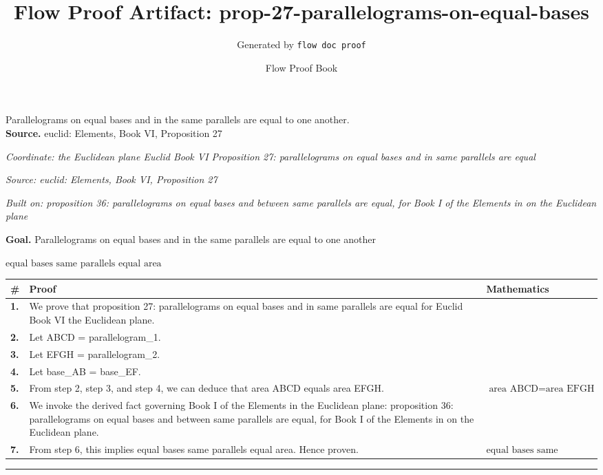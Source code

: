 \documentclass[11pt]{article}
\title{Flow Proof Artifact: prop-27-parallelograms-on-equal-bases}
\author{Generated by \texttt{flow doc proof}}
\date{Flow Proof Book}
\theoremstyle{definition}
\begin{document}
\maketitle
Parallelograms on equal bases and in the same parallels are equal to one another.\\[0.5em]
\textbf{Source.} euclid: Elements, Book VI, Proposition 27\\[0.5em]
\bigskip
{}\par
\smallskip\noindent\textit{Coordinate: the Euclidean plane \cdot Euclid Book VI \cdot Proposition 27: parallelograms on equal bases and in same parallels are equal}\par
\smallskip\noindent\textit{Source: euclid: Elements, Book VI, Proposition 27}\par
\smallskip\noindent\textit{Built on: proposition 36: parallelograms on equal bases and between same parallels are equal, for Book I of the Elements in on the Euclidean plane}\par
\medskip
\noindent\textbf{Goal.} Parallelograms on equal bases and in the same parallels are equal to one another\par
\noindent$\displaystyle \text{equal bases same parallels equal area}$\par
\medskip
\noindent
\begin{tabular}{@{} >{\raggedright\arraybackslash}p{} >{\raggedright\arraybackslash}p{} >{\raggedleft\arraybackslash}p{} @{}}
\textbf{\#} & \textbf{Proof} & \textbf{Mathematics} \\
\midrule
\textbf{1.} & We prove that proposition 27: parallelograms on equal bases and in same parallels are equal for Euclid Book VI the Euclidean plane. & \\[0.45em]
\textbf{2.} & Let ABCD = parallelogram\_1. & \\[0.45em]
\textbf{3.} & Let EFGH = parallelogram\_2. & \\[0.45em]
\textbf{4.} & Let base\_AB = base\_EF. & \\[0.45em]
\textbf{5.} & From step 2, step 3, and step 4, we can deduce that area ABCD equals area EFGH. & $\displaystyle \text{area ABCD} = \text{area EFGH}$ \\[0.45em]
\textbf{6.} & We invoke the derived fact governing Book I of the Elements in the Euclidean plane: proposition 36: parallelograms on equal bases and between same parallels are equal, for Book I of the Elements in on the Euclidean plane. & \\[0.45em]
\textbf{7.} & From step 6, this implies equal bases same parallels equal area. Hence proven. & $\displaystyle \text{equal bases same parallels equal area}$ \\[0.45em]
\bottomrule
\end{tabular}
\label{thm:Geometry-Euclid Book VI-proposition_27_parallelograms_on_equal_bases_and_in_same_parallels_are_equal}
\par\medskip\hrule
\end{document}
